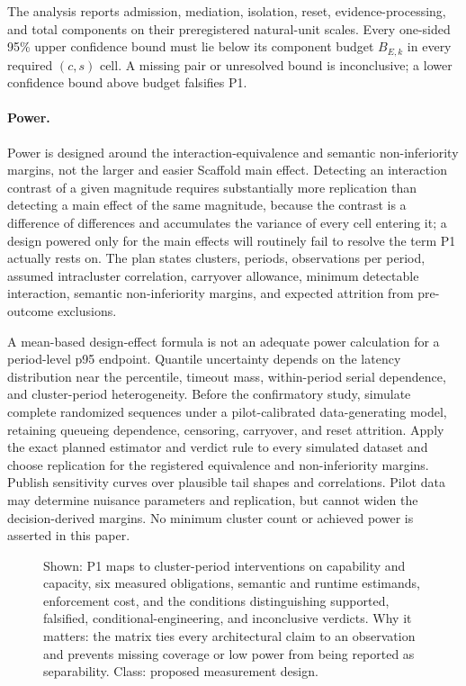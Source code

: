 The analysis reports admission, mediation, isolation, reset, evidence-processing, and total components on their preregistered natural-unit scales. Every one-sided 95\% upper confidence bound must lie below its component budget $B_{E,k}$ in every required $(c,s)$ cell. A missing pair or unresolved bound is inconclusive; a lower confidence bound above budget falsifies P1.

\paragraph{Power.}
Power is designed around the interaction-equivalence and semantic non-inferiority margins, not the larger and easier Scaffold main effect. Detecting an interaction contrast of a given magnitude requires substantially more replication than detecting a main effect of the same magnitude, because the contrast is a difference of differences and accumulates the variance of every cell entering it; a design powered only for the main effects will routinely fail to resolve the term P1 actually rests on. The plan states clusters, periods, observations per period, assumed intracluster correlation, carryover allowance, minimum detectable interaction, semantic non-inferiority margins, and expected attrition from pre-outcome exclusions.

A mean-based design-effect formula is not an adequate power calculation for a period-level p95 endpoint. Quantile uncertainty depends on the latency distribution near the percentile, timeout mass, within-period serial dependence, and cluster-period heterogeneity. Before the confirmatory study, simulate complete randomized sequences under a pilot-calibrated data-generating model, retaining queueing dependence, censoring, carryover, and reset attrition. Apply the exact planned estimator and verdict rule to every simulated dataset and choose replication for the registered equivalence and non-inferiority margins. Publish sensitivity curves over plausible tail shapes and correlations. Pilot data may determine nuisance parameters and replication, but cannot widen the decision-derived margins. No minimum cluster count or achieved power is asserted in this paper.

\begin{figure}[t]
\centering
\caption{Shown: P1 maps to cluster-period interventions on capability and capacity, six measured obligations, semantic and runtime estimands, enforcement cost, and the conditions distinguishing supported, falsified, conditional-engineering, and inconclusive verdicts. Why it matters: the matrix ties every architectural claim to an observation and prevents missing coverage or low power from being reported as separability. Class: proposed measurement design.}
\label{fig:evaluation-matrix}
\end{figure}

